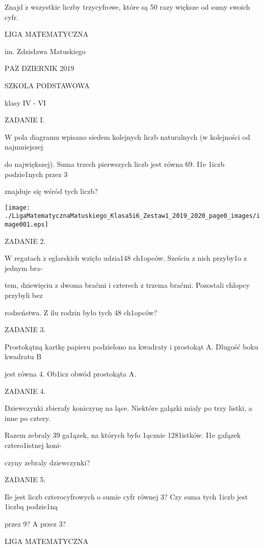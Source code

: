 \documentclass[a4paper,12pt]{article}
\begin{document}
Znajd $\acute{\mathrm{z}}$ wszystkie liczby trzycyfrowe, które są 50 razy większe od sumy swoich cyfr.






LIGA MATEMATYCZNA

im. Zdzisława Matuskiego

$\mathrm{P}\mathrm{A}\dot{\mathrm{Z}}$ DZIERNIK 2019

SZKOLA PODSTAWOWA

klasy IV - VI

ZADANIE I.

W pola diagramu wpisano siedem kolejnych liczb naturalnych (w kolejności od najmniejszej

do największej). Suma trzech pierwszych liczb jest równa 69. I1e 1iczb podzie1nych przez 3

znajduje się wśród tych liczb?
\begin{center}
\texttt{[image: ./LigaMatematycznaMatuskiego\_Klasa5i6\_Zestaw1\_2019\_2020\_page0\_images/image001.eps]}
\end{center}
ZADANIE 2.

$\mathrm{W}$ regatach $\dot{\mathrm{z}}$ eglarskich wzięło udzia148 ch1opców. Sześciu z nich przyby1o z jednym bra-

tem, dziewięciu z dwoma braćmi i czterech z trzema braćmi. Pozostali chlopcy przybyli bez

rodzeństwa. $\mathrm{Z}$ ilu rodzin było tych 48 ch1opców?

ZADANIE 3.

Prostokątną kartkę papieru podzielono na kwadraty i prostokąt A. Dlugość boku kwadratu $\mathrm{B}$

jest równa 4. Ob1icz obwód prostokąta A.

ZADANIE 4.

Dziewczynki zbierafy koniczynę na lące. Niektóre galązki mialy po trzy listki, a inne po cztery.

Razem zebraly 39 ga1ązek, na których byfo 1ącznie 1281istków. I1e gafązek cztero1istnej koni-

czyny zebraly dziewczynki?

ZADANIE 5.

Ile jest liczb czterocyfrowych o sumie cyfr równej 3? Czy suma tych 1iczb jest 1iczbą podzie1ną

przez 9? A przez 3?






LIGA MATEMATYCZNA
\end{document}
